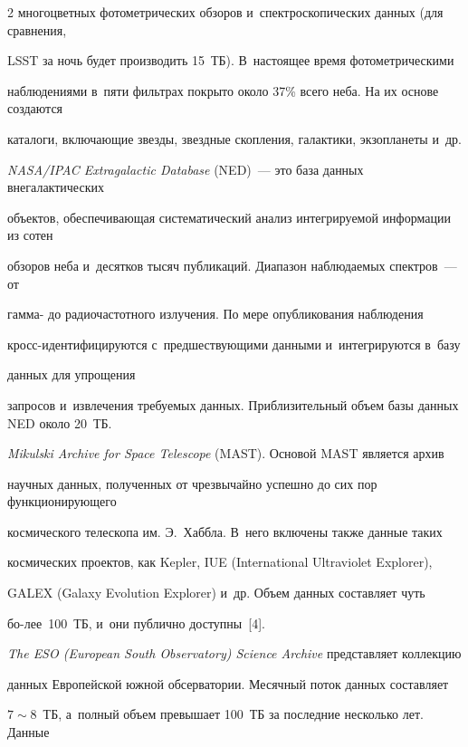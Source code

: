 \begin{multicols}{2}
многоцветных фотометрических обзоров и~спект\-ро\-скопических данных (для сравнения, 


LSST за ночь будет производить 15~ТБ). В~настоящее время фотометрическими 


наблюдениями в~пяти фильтрах покрыто около 37\% всего неба. На их основе создаются 


каталоги, включающие звезды, звездные скопления, галактики, экзопланеты и~др.


  


  \textit{NASA/IPAC Extragalactic Database} (NED)~--- это база данных внегалактических 


объектов, обеспечивающая систематический анализ интегрируемой информации из сотен 


обзоров неба и~десятков тысяч публикаций. Диапазон наблюдаемых спект\-ров~--- от  


гамма- до радиочастотного излучения. По мере опубликования наблюдения 


кросс-иден\-ти\-фи\-ци\-ру\-ют\-ся с~предшествующими данными и~интегрируются в~базу 


данных для упрощения 


запросов и~извлечения требуемых данных. Приблизительный объем базы данных NED около 20~ТБ. 


  


  \textit{Mikulski Archive for Space Telescope} (MAST). Основой MAST является архив 


научных данных, полученных от чрезвычайно успешно до сих пор функционирующего 


космического телескопа им. Э.~Хаббла. В~него включены также данные таких 


космических проектов, как Kepler, IUE (International Ultraviolet Explorer), 


GALEX (Galaxy Evolution Explorer) и~др. Объем данных составляет чуть 


бо-\linebreak лее~100~ТБ, и~они публично доступны~[4]. 


  


  \textit{The ESO (European South Observatory) Science Archive} представляет коллекцию 


данных Европейской южной обсерватории. Месячный поток данных составляет 


$7\sim8$~ТБ, а~полный объем превышает 100~ТБ за последние несколько лет. Данные 



\end{multicols}
